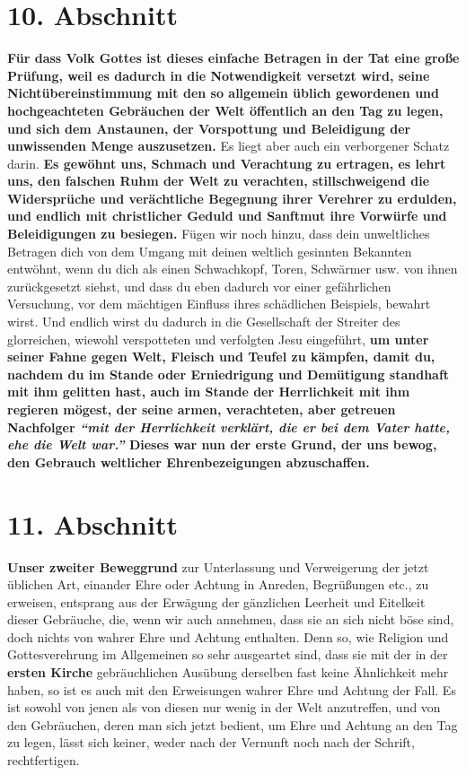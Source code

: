 \section{10. Abschnitt} \label{kap9_ab10}

\label{ref:09_10_spott} \textbf{Für dass Volk Gottes ist dieses einfache
Betragen in der Tat
eine große
Prüfung,
weil es dadurch in die Notwendigkeit versetzt wird, seine Nichtübereinstimmung
mit den so allgemein üblich gewordenen und hochgeachteten Gebräuchen der Welt
öffentlich an den Tag zu legen, und sich dem Anstaunen, der Vorspottung und
Beleidigung der unwissenden Menge auszusetzen.} Es liegt aber auch ein
verborgener Schatz darin. \textbf{Es gewöhnt uns, Schmach und Verachtung zu
ertragen,
es lehrt uns, den falschen Ruhm der Welt zu verachten,
stillschweigend die
Widersprüche und verächtliche Begegnung ihrer Verehrer zu erdulden, und endlich
mit christlicher Geduld und Sanftmut ihre Vorwürfe und Beleidigungen zu
besiegen.} Fügen wir noch hinzu, dass dein unweltliches Betragen dich von dem
Umgang mit deinen weltlich gesinnten Bekannten entwöhnt, wenn
du dich als einen
Schwachkopf, Toren, Schwärmer usw. von ihnen zurückgesetzt siehst, und dass
du eben dadurch vor einer gefährlichen Versuchung, vor dem mächtigen Einfluss
ihres schädlichen Beispiels, bewahrt wirst. Und endlich wirst du dadurch in
die Gesellschaft der Streiter des glorreichen, wiewohl verspotteten und
verfolgten Jesu eingeführt, \textbf{um unter seiner Fahne
gegen Welt, Fleisch und Teufel
zu kämpfen, damit du, nachdem du im Stande oder Erniedrigung und Demütigung
standhaft mit ihm gelitten hast, auch im Stande der Herrlichkeit mit ihm
regieren mögest, der seine armen, verachteten, aber getreuen Nachfolger
\textit{"`mit der Herrlichkeit verklärt, die er bei dem Vater hatte, ehe die
Welt
war."'}
Dieses war nun der erste Grund, der uns bewog, den
Gebrauch weltlicher Ehrenbezeigungen abzuschaffen.}

\section{11. Abschnitt} \label{kap9_ab11}

\textbf{Unser zweiter Beweggrund} zur Unterlassung und Verweigerung der jetzt
üblichen
Art, einander Ehre oder Achtung in Anreden, Begrüßungen etc., zu erweisen,
entsprang aus der Erwägung der gänzlichen Leerheit und Eitelkeit dieser
Gebräuche, die, wenn wir auch annehmen, dass sie an sich nicht böse sind, doch
nichts von wahrer Ehre und Achtung enthalten. Denn so, wie Religion und
Gottesverehrung im Allgemeinen so sehr ausgeartet sind, dass sie mit der in der
\textbf{ersten Kirche} gebräuchlichen Ausübung derselben
fast keine Ähnlichkeit mehr
haben, so ist es auch mit den Erweisungen wahrer Ehre und Achtung der Fall. Es
ist sowohl von jenen als von diesen nur wenig in der Welt anzutreffen, und von
den Gebräuchen, deren man sich jetzt bedient, um Ehre und Achtung an den Tag zu
legen, lässt sich keiner, weder nach der Vernunft noch nach der Schrift,
rechtfertigen.

